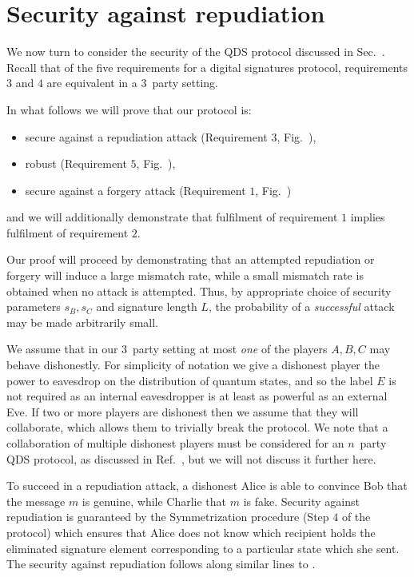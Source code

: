 \section{Security against repudiation}
We now turn to consider the security of the QDS protocol discussed in Sec.~. Recall that of the five requirements for a digital signatures protocol, requirements $3$ and $4$ are equivalent in a $3$~party setting. 

In what follows we will prove that our protocol is:
\begin{itemize}
\item secure against a repudiation attack (Requirement $3$, Fig.~), 
\item robust (Requirement $5$, Fig.~),
\item secure against a forgery attack (Requirement $1$, Fig.~)
\end{itemize}
and we will additionally demonstrate that fulfilment of requirement $1$ implies fulfilment of requirement $2$. 

Our proof will proceed by demonstrating that an attempted repudiation or forgery will induce a large mismatch rate, while a small mismatch rate is obtained when no attack is attempted. Thus, by appropriate choice of security parameters $s_B, s_C$ and signature length $L$, the probability of a \emph{successful} attack may be made arbitrarily small.

We assume that in our $3$~party setting at most \emph{one} of the players $A, B, C$ may behave dishonestly. For simplicity of notation we give a dishonest player the power to eavesdrop on the distribution of quantum states, and so the label $E$ is not required as an internal eavesdropper is at least as powerful as an external Eve. If two or more players are dishonest then we assume that they will collaborate, which allows them to trivially break the protocol. We note that a collaboration of multiple dishonest players must be considered for an $n$~party QDS protocol, as discussed in Ref.~, but we will not discuss it further here.

To succeed in a repudiation attack, a dishonest Alice is able to convince Bob that the message $m$ is genuine, while Charlie that $m$ is fake. Security against repudiation is guaranteed by the Symmetrization procedure (Step $4$ of the protocol) which ensures that Alice does not know which recipient holds the eliminated signature element corresponding to a particular state which she sent. The security against repudiation follows along similar lines to .

